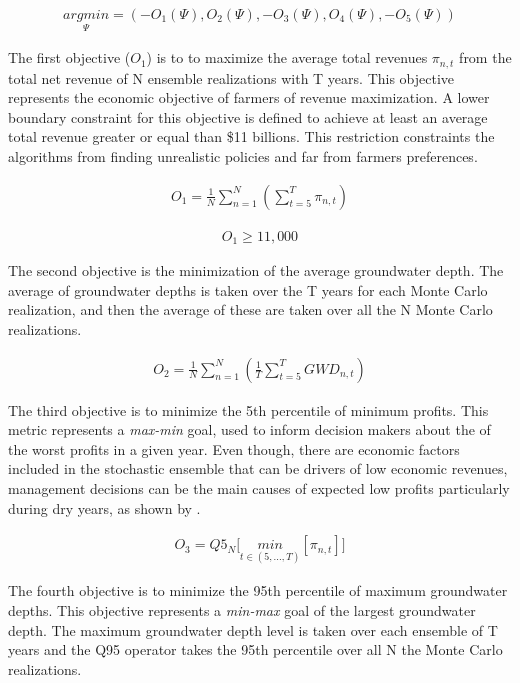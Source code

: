 \documentclass[11pt,a4paper]{article}
\begin{document}
\begin{align}
\underset{\Psi}{argmin} = (-O_{1}(\Psi),O_{2}(\Psi),-O_{3}(\Psi),O_{4}(\Psi),-O_{5}(\Psi))
\end{align}

The first objective ($O_{1}$) is to to maximize the average total revenues $\pi_{n,t}$ from the total net revenue of N ensemble realizations with T years. This objective represents the economic objective of farmers of revenue maximization. A lower boundary constraint for this objective is defined to achieve at least an average total revenue greater or equal than \$11 billions. This restriction constraints the algorithms from finding unrealistic policies and far from farmers preferences. 

\begin{align}
O_{1} = \frac{1}{N}\sum_{n=1}^N(\sum_{t=5}^T \pi_{n,t})
\end{align}


\begin{align}
O_{1} \geq 11,000
\end{align}

The second objective is the minimization of the average groundwater depth. The average of groundwater depths is taken over the T years for each Monte Carlo realization, and then the average of these are taken over all the N Monte Carlo realizations. 

\begin{align}
O_{2} = \frac{1}{N}\sum_{n=1}^N(\frac{1}{T}\sum_{t=5}^T GWD_{n,t})
\end{align}

The third objective is to minimize the 5th percentile of minimum profits. This metric represents a \textit{max-min} goal, used to inform decision makers about the of the worst profits in a given year. Even though, there are economic factors included in the stochastic ensemble that can be drivers of low economic revenues, management decisions can be the main causes of expected low profits particularly during dry years, as shown by \textcite{rodriguez-flores_global_2022}. 

\begin{align}
O_{3} = Q5_{N} \bigg[\underset{t\in(5,...,T)}{min}[\pi_{n,t}]\bigg]
\end{align}

The fourth objective is to minimize the 95th percentile of maximum groundwater depths. This objective represents a \textit{min-max} goal of the largest groundwater depth.  The maximum groundwater depth level is taken over each ensemble of T years and the Q95 operator takes the 95th percentile over all N the Monte Carlo  realizations. 
\end{document}
